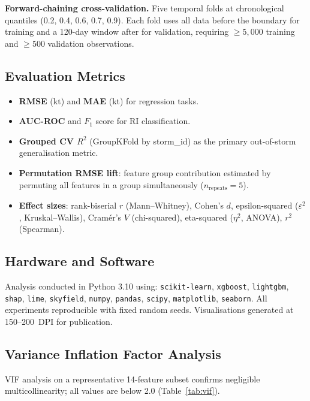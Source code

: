 \documentclass[12pt,a4paper]{article}
\begin{document}
    \textbf{Forward-chaining cross-validation.} Five temporal folds at
    chronological quantiles (0.2, 0.4, 0.6, 0.7, 0.9). Each fold uses all data
    before the boundary for training and a 120-day window after for validation,
    requiring $\geq 5{,}000$ training and $\geq 500$ validation observations.

    \subsection{Evaluation Metrics}

    \begin{itemize}[noitemsep]
    \item \textbf{RMSE} (kt) and \textbf{MAE} (kt) for regression tasks.
    \item \textbf{AUC-ROC} and $F_1$ score for RI classification.
    \item \textbf{Grouped CV $R^2$} (GroupKFold by storm\_id) as the primary
            out-of-storm generalisation metric.
    \item \textbf{Permutation RMSE lift}: feature group contribution estimated
            by permuting all features in a group simultaneously ($n_{\text{repeats}} = 5$).
    \item \textbf{Effect sizes}: rank-biserial $r$ (Mann--Whitney), Cohen's $d$,
            epsilon-squared ($\varepsilon^2$, Kruskal--Wallis), Cram\'er's $V$
            (chi-squared), eta-squared ($\eta^2$, ANOVA), $r^2$ (Spearman).
    \end{itemize}

    \subsection{Hardware and Software}

    Analysis conducted in Python 3.10 using: \texttt{scikit-learn}, \texttt{xgboost},
    \texttt{lightgbm}, \texttt{shap}, \texttt{lime}, \texttt{skyfield},
    \texttt{numpy}, \texttt{pandas}, \texttt{scipy}, \texttt{matplotlib},
    \texttt{seaborn}. All experiments reproducible with fixed random seeds.
    Visualisations generated at 150--200~DPI for publication.

    \subsection{Variance Inflation Factor Analysis}

    VIF analysis on a representative 14-feature subset confirms negligible
    multicollinearity; all values are below 2.0 (Table~\ref{tab:vif}).
\end{document}
